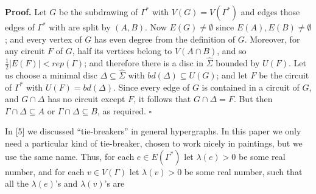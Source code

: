 \textbf{Proof.} Let $G$ be the subdrawing of $\Gamma^*$ with $V(G) = V(\Gamma^*)$ and edges those edges of $\Gamma^*$ with are split by $(A, B)$. Now $E(G) \ne \emptyset$ since $E(A), E(B) \ne \emptyset$; and every vertex of $G$ has even degree from the definition of $G$. Moreover, for any circuit $F$ of $G$, half its vertices belong to $V(A \cap B)$, and so $\frac{1}{2}|E(F)| < rep(\Gamma)$; and therefore there is a disc in $\hat{\Sigma}$ bounded by $U(F)$. Let us choose a minimal disc $\Delta \subseteq \hat{\Sigma}$ with $bd(\Delta) \subseteq U(G)$; and let $F$ be the circuit of $\Gamma^*$ with $U(F) = bd(\Delta)$. Since every edge of $G$ is contained in a circuit of $G$, and $G \cap \Delta$ has no circuit except $F$, it follows that $G \cap \Delta = F$. But then $\Gamma \cap \Delta \subseteq A$ or $\Gamma \cap \Delta \subseteq B$, as required. $\square$

In [5] we discussed ``tie-breakers'' in general hypergraphs. In this paper we only need a particular kind of tie-breaker, chosen to work nicely in paintings, but we use the same name. Thus, for each $e \in E(\Gamma^*)$ let $\lambda(e) > 0$ be some real number, and for each $v \in V(\Gamma)$ let $\lambda(v) > 0$ be some real number, such that all the $\lambda(e)$'s and $\lambda(v)$'s are
